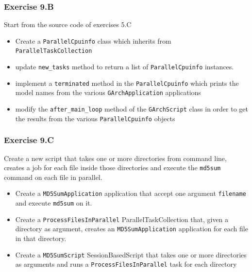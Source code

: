 \documentclass[english,serif,mathserif,xcolor=pdftex,dvipsnames,table]{beamer}
\begin{document}
\begin{frame}
  \frametitle{Exercise 9.B}

  Start from the source code of exercises 5.C

  \begin{itemize}
  \item Create a \lstinline|ParallelCpuinfo| class which
    inherits from \lstinline|ParallelTaskCollection|
  \item update \lstinline|new_tasks| method to return a list of
    \lstinline|ParallelCpuinfo| instances.
  \item implement a \lstinline|terminated| method in the
    \lstinline|ParallelCpuinfo| which prints the model names from the
    various \lstinline|GArchApplication| applications
  \item modify the \lstinline|after_main_loop| method of the
    \lstinline|GArchScript| class in order to get the results from the
    various \lstinline|ParallelCpuinfo| objects
  \end{itemize}
\end{frame}

\begin{frame}
  \frametitle{Exercise 9.C}
  
  Create a new script that takes one or more directories from command
  line, creates a job for each file inside those directories and
  execute the \lstinline|md5sum| command on each file in parallel.

  \begin{itemize}
  \item Create a \lstinline|MD5SumApplication| application that accept
    one argument \lstinline|filename| and execute \lstinline|md5sum|
    on it.
  \item Create a \lstinline|ProcessFilesInParallel|
    ParallelTaskCollection that, given a directory as argument,
    creates an \lstinline|MD5SumApplication| application for each file
    in that directory.
  \item Create a \lstinline|MD5SumScript| SessionBasedScript that
    takes one or more directories as arguments and runs a
    \lstinline|ProcessFilesInParallel| task for each directory
  \end{itemize}
\end{frame}
\end{document}
